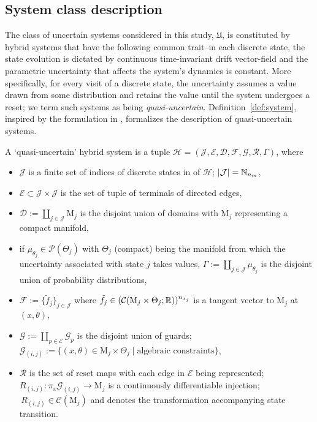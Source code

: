   \subsection{System class description}
  The class of uncertain systems considered in this study, $\mathfrak{U}$, is constituted by hybrid systems that have the following common trait--in each discrete state, the state evolution is dictated by continuous time-invariant drift vector-field and the parametric uncertainty that affects the system's dynamics is constant. More specifically, for every visit of a discrete state, the uncertainty assumes a value drawn from some distribution and retains the value until the system undergoes a reset; we term such systems as being \emph{quasi-uncertain}. Definition~\ref{def:system}, inspired by the formulation in \cite{Burden2013}, formalizes the description of quasi-uncertain systems.
\begin{defn}\label{def:system}
  A `quasi-uncertain' hybrid system is a tuple \mbox{$\mathcal H=(\mathcal J,\mathcal E,\mathcal D,\mathcal F,\mathcal G,\mathcal R,\Gamma)$}, where
  \begin{itemize}
    \item $\mathcal J$ is a finite set of indices of discrete states in of $\mathcal H$; $|\mathcal J|=\mathbb{N}_{n_m}$,
    \item $\mathcal E\subset \mathcal J\times \mathcal J$ is the set of tuple of terminals of directed edges,
    \item $\mathcal D:=\coprod_{j\in\mathcal J} \mathrm{M}_j$ is the disjoint union of domains with  $\mathrm{M}_j$ representing a compact manifold,
    \item if $\mu_{\theta_j}\in \mathcal P(\Theta_j)$ with  $\Theta_j$ (compact) being the manifold from which the uncertainty associated with state $j$ takes values, $\Gamma:=\coprod_{j\in \mathcal J} \mu_{\theta_j}$ is the disjoint union of probability distributions,
    \item $\mathcal F:=\{\tilde f_j\}_{j\in \mathcal J}$ where \mbox{$\tilde f_j\in (\mathcal C(\mathrm{M}_j\times \Theta_j;\mathbb{R}))^{n_{x_j}}$} is a tangent vector to $\mathrm{M}_j$ at $(x,\theta)$,
    \item $\mathcal G:=\coprod_{p\in \mathcal E}\mathcal G_p$ is the disjoint union of guards; \mbox{$\mathcal G_{(i,j)}:=\{(x,\theta)\in \mathrm{M}_j\times \Theta_j\mid \text{algebraic constraints}\}$},
    \item $\mathcal R$ is the set of reset maps with each edge in $\mathcal E$ being represented; $R_{(i,j)}\colon \pi_{x}\mathcal G_{(i,j)}\rightarrow \mathrm{M}_j$ is a continuously differentiable injection; $\,R_{(i,j)}\in \mathcal C(\mathrm{M}_j)$ and denotes the transformation accompanying state transition.
  \end{itemize}
\end{defn}
